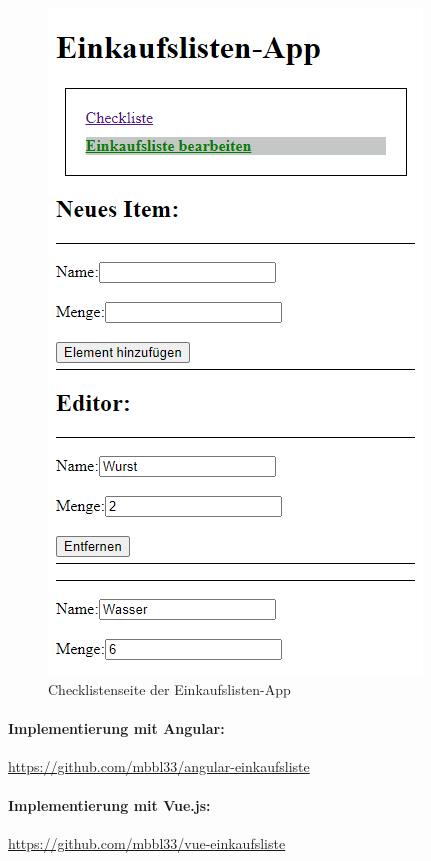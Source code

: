 \begin{figure}[h]
\begin{minipage}[b]{.45\textwidth}
    \end{minipage}
    \hspace{.1\linewidth}%
    \begin{minipage}[b]{.45\textwidth}
        \includegraphics[width=\textwidth]{img/vue-Einkaufsliste-Editor}
        \caption{Checklistenseite der Einkaufslisten-App}
        \label{fig:editlistenseite}
    \end{minipage}
\end{figure}

\paragraph{Implementierung mit Angular:} \url{https://github.com/mbbl33/angular-einkaufsliste}
\paragraph{Implementierung mit Vue.js:} \url{https://github.com/mbbl33/vue-einkaufsliste}